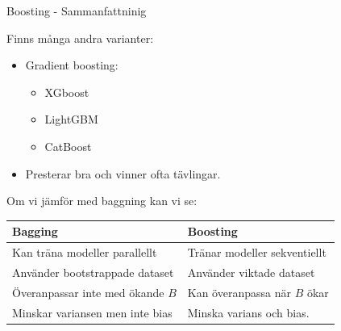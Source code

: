 \documentclass[10pt,english]{beamer}
\begin{document}
\begin{frame}{Boosting - Sammanfattninig}
    
    Finns många andra varianter:
    \begin{itemize}
        \item Gradient boosting:
        \begin{itemize}
            \item XGboost
            \item LightGBM
            \item CatBoost
        \end{itemize}
        \item Presterar bra och vinner ofta tävlingar.
    \end{itemize}

    Om vi jämför med baggning kan vi se:

    \begin{tabular}{l | l}
        Bagging & Boosting \\ \hline
        Kan träna modeller parallellt & Tränar modeller sekventiellt \\
        Använder bootstrappade dataset & Använder viktade dataset \\
        Överanpassar inte med ökande $B$ & Kan överanpassa när $B$ ökar \\
        Minskar variansen men inte bias & Minska varians och bias.
        
    \end{tabular}

\end{frame}
\end{document}

